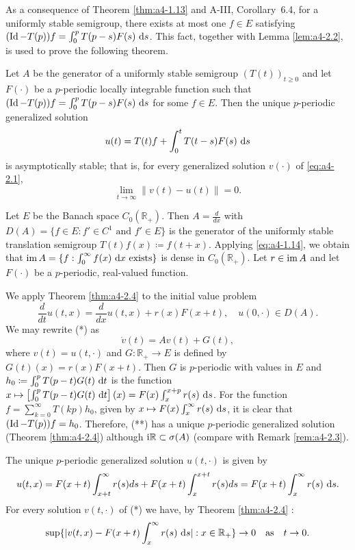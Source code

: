 \bigskip
\noindent
As a consequence of Theorem \ref{thm:a4-1.13}  and A-III, Corollary~6.4, for a uniformly stable semigroup, there exists at most one $f \in E$ satisfying $(\operatorname{Id}-T(p))f = \int_{0}^{p} T(p-s)F(s) \,\mathop{}\!\mathrm{d}{s}$. 
This fact, together with Lemma \ref{lem:a4-2.2}, is used to prove the following theorem.


\begin{theorem}\label{thm:a4-2.4}
Let $A$ be the generator of a uniformly stable semigroup $(T(t))_{t \geq 0}$ and let $F(\cdot)$ be a $p$-periodic locally integrable function such that $(\operatorname{Id} - T(p))f = \int_{0}^{p} T(p-s)F(s) \,\mathop{}\!\mathrm{d}{s}$ for some $f \in E$. 
Then the unique $p$-periodic generalized solution
\[
u(t) = T(t)f + \int_{0}^{t} T(t-s)F(s) \,\mathop{}\!\mathrm{d}{s}
\]
is asymptotically stable; that is, for every generalized solution $v(\cdot)$ of \eqref{eq:a4-2.1}, 
\[
\lim_{t \to \infty} \|v(t) - u(t)\| = 0.
\]
\end{theorem}

\begin{example}\label{ex:a4-2.5}
Let $E$ be the Banach space $C_{0}(\mathbb{R}_{+})$. 
Then $A = \frac{d}{dx}$ with $D(A) = \{f \in E: f' \in C^{1} \text{ and } f' \in E\}$ is the generator of the uniformly stable translation semigroup $T(t)f(x) \coloneqq f(t+x)$. 
Applying \eqref{eq:a4-1.14}, we obtain that $\mathop{}\!\mathrm{im}\, A = \{f : \int_{0}^{\infty} f(x) \,\mathop{}\!\mathrm{d}{x} \text{ exists}\}$ is dense in $C_{0}(\mathbb{R}_{+})$. 
Let $r \in \mathop{}\!\mathrm{im}\, A$ and let $F(\cdot)$ be a $p$-periodic, real-valued function.

\noindent
We apply Theorem \ref{thm:a4-2.4}  to the initial value problem
\begin{equation}
 \frac{d}{dt} u(t,x) = \frac{d}{dx}u(t,x) + r(x)F(x+t), \quad u(0,\cdot) \in D(A). 
 \tag{*}
\end{equation}
We may rewrite (*) as
\begin{equation}
\dot{v}(t) = Av(t) + G(t), \tag{**}
\end{equation}
where $v(t) = u(t,\cdot)$ and $G : \mathbb{R}_{+} \to E$ is defined by $G(t)(x) = r(x)F(x+t)$.
Then $G$ is $p$-periodic with values in $E$ and $h_{0} \coloneqq \int_{0}^{p} T(p-t)G(t) \,\mathop{}\!\mathrm{d}{t}$ is the function $x \mapsto \left[\int_{0}^{p} T(p-t)G(t) \,\mathop{}\!\mathrm{d}{t}\right](x) = F(x)\int_{x}^{x+p} r(s) \,\mathop{}\!\mathrm{d}{s}$. 
For the function $f = \sum_{k=0}^{\infty} T(kp)h_{0}$, given by $x \mapsto F(x)\int_{x}^{\infty} r(s) \,\mathop{}\!\mathrm{d}{s}$, it is clear that $(\operatorname{Id} - T(p))f = h_{0}$. 
Therefore, (**) has a unique $p$-periodic generalized solution (Theorem \ref{thm:a4-2.4}) although $\mathrm{i} \mathbb{R} \subset \sigma(A)$ (compare with Remark \ref{rem:a4-2.3}).

\noindent
The unique $p$-periodic generalized solution $u(t,\cdot)$ is given by 
\[
u(t,x) = F(x+t)\int_{x+t}^{\infty} r(s)ds + F(x+t)\int_{x}^{x+t} r(s)ds = F(x+t)\int_{x}^{\infty} r(s)\,\mathop{}\!\mathrm{d}{s}.
\]
For every solution $v(t,\cdot)$ of (*) we have, by Theorem \ref{thm:a4-2.4} :
\[
\sup\{|v(t,x) - F(x+t)\int_{x}^{\infty} r(s) \,\mathop{}\!\mathrm{d}{s}| : x \in \mathbb{R}_{+}\} \to 0 \quad \text{as} \quad t \to 0.
\]
\end{example}


